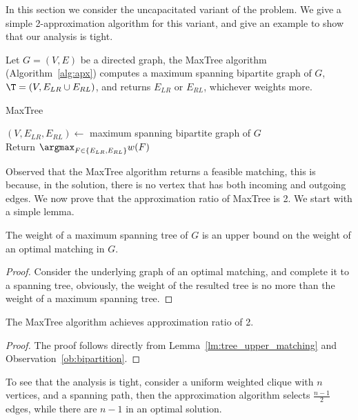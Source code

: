 \label{sec:ucudcm}
In this section we consider the uncapacitated variant of the problem. 
We give a simple 2-approximation algorithm for this variant, 
and give an example to show that our analysis is tight.

Let $G = (V, E)$ be a directed graph, 
the MaxTree algorithm (Algorithm~\ref{alg:apx})
computes a maximum spanning bipartite graph of $G$, 
$\T = (V, E_{LR} \cup E_{RL})$, 
and returns $E_{LR}$ or $E_{RL}$, 
whichever weights more.

\begin{algorithm}
\caption{
\label{alg:apx}
MaxTree}
$(V, E_{LR}, E_{RL}) \leftarrow$ maximum spanning bipartite graph of $G$	\\
Return $\argmax_{F \in \{ E_{LR}, E_{RL} \}}{w(F)} $						\\
\end{algorithm}

Observed that the MaxTree algorithm returns a feasible matching,
this is because, in the solution, 
there is no vertex that has both incoming and outgoing edges.  
We now prove that the approximation ratio of MaxTree is 2.
We start with a simple lemma.

\begin{lemma}
\label{lm:tree_upper_matching}
The weight of a maximum spanning tree of $G$ is an upper bound on the weight of
an optimal matching in $G$.
\end{lemma}

\begin{proof}
Consider the underlying graph of an optimal matching, 
and complete it to a spanning tree, obviously, the
weight of the resulted tree is no more than the weight of a maximum spanning
tree.
\end{proof}

\begin{theorem}
The MaxTree algorithm achieves approximation ratio of 2.
\end{theorem}

\begin{proof}
The proof follows directly from 
Lemma~\ref{lm:tree_upper_matching} and Observation~\ref{ob:bipartition}.
\end{proof}

To see that the analysis is tight, 
consider a uniform weighted clique with $n$ vertices, 
and a spanning path, 
then the approximation algorithm selects $\frac{n - 1}{2}$ edges, 
while there are $n - 1$ in an optimal solution.  